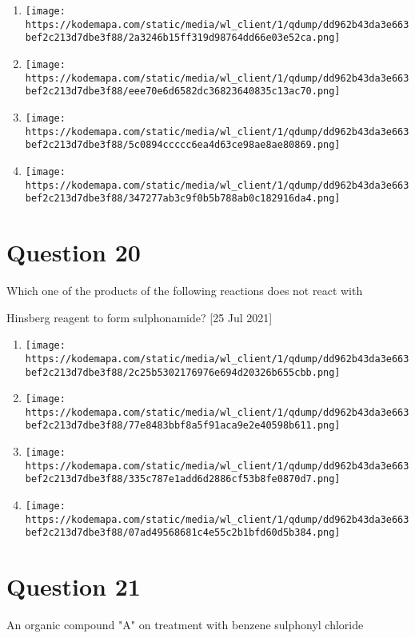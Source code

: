 \documentclass{article}
\begin{document}
\begin{enumerate}[label=(\alph*)]
\item \texttt{[image: https://kodemapa.com/static/media/wl\_client/1/qdump/dd962b43da3e663bef2c213d7dbe3f88/2a3246b15ff319d98764dd66e03e52ca.png]}


\item \texttt{[image: https://kodemapa.com/static/media/wl\_client/1/qdump/dd962b43da3e663bef2c213d7dbe3f88/eee70e6d6582dc36823640835c13ac70.png]}


\item \texttt{[image: https://kodemapa.com/static/media/wl\_client/1/qdump/dd962b43da3e663bef2c213d7dbe3f88/5c0894ccccc6ea4d63ce98ae8ae80869.png]}


\item \texttt{[image: https://kodemapa.com/static/media/wl\_client/1/qdump/dd962b43da3e663bef2c213d7dbe3f88/347277ab3c9f0b5b788ab0c182916da4.png]}


\end{enumerate}
\newpage
\section*{Question 20}
Which one of the products of the following reactions does not react with

Hinsberg reagent to form sulphonamide? {[}25 Jul 2021{]}


\begin{enumerate}[label=(\alph*)]
\item \texttt{[image: https://kodemapa.com/static/media/wl\_client/1/qdump/dd962b43da3e663bef2c213d7dbe3f88/2c25b5302176976e694d20326b655cbb.png]}


\item \texttt{[image: https://kodemapa.com/static/media/wl\_client/1/qdump/dd962b43da3e663bef2c213d7dbe3f88/77e8483bbf8a5f91aca9e2e40598b611.png]}


\item \texttt{[image: https://kodemapa.com/static/media/wl\_client/1/qdump/dd962b43da3e663bef2c213d7dbe3f88/335c787e1add6d2886cf53b8fe0870d7.png]}


\item \texttt{[image: https://kodemapa.com/static/media/wl\_client/1/qdump/dd962b43da3e663bef2c213d7dbe3f88/07ad49568681c4e55c2b1bfd60d5b384.png]}


\end{enumerate}
\newpage
\section*{Question 21}
An organic compound "A" on treatment with benzene sulphonyl chloride
\end{document}
